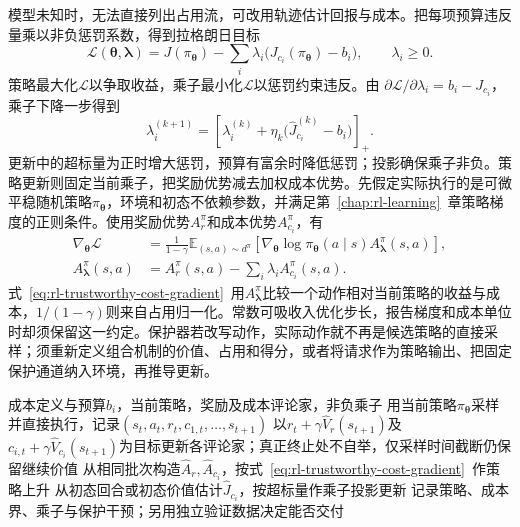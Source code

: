 模型未知时，无法直接列出占用流，可改用轨迹估计回报与成本。把每项预算违反量乘以非负惩罚系数，得到拉格朗日目标
\begin{equation}
  \mathcal L(\bm{\theta},\bm{\lambda})
    =J(\pi_{\bm{\theta}})
       -\sum_i\lambda_i\bigl(J_{c_i}(\pi_{\bm{\theta}})-b_i\bigr),
  \qquad \lambda_i\geq0.
  \label{eq:rl-trustworthy-lagrangian}
\end{equation}
策略最大化$\mathcal L$以争取收益，乘子最小化$\mathcal L$以惩罚约束违反。由
$\partial\mathcal L/\partial\lambda_i=b_i-J_{c_i}$，乘子下降一步得到
\[
  \lambda_i^{(k+1)}
   =\left[\lambda_i^{(k)}
       +\eta_k\bigl(\widehat J_{c_i}^{(k)}-b_i\bigr)\right]_+.
\]
更新中的超标量为正时增大惩罚，预算有富余时降低惩罚；投影确保乘子非负。策略更新则固定当前乘子，把奖励优势减去加权成本优势。先假定实际执行的是可微平稳随机策略$\pi_{\bm{\theta}}$，环境和初态不依赖参数，并满足第~\ref{chap:rl-learning}~章策略梯度的正则条件。使用奖励优势$A_r^\pi$和成本优势$A_{c_i}^\pi$，有
\begin{equation}
  \begin{aligned}
    \nabla_{\bm{\theta}}\mathcal L
      &=\frac{1}{1-\gamma}
        \mathbb E_{(s,a)\sim d^\pi}
          \left[\nabla_{\bm{\theta}}\log\pi_{\bm{\theta}}(a\mid s)
                 A_{\bm{\lambda}}^\pi(s,a)\right],\\
    A_{\bm{\lambda}}^\pi(s,a)
      &=A_r^\pi(s,a)-\sum_i\lambda_iA_{c_i}^\pi(s,a).
  \end{aligned}
  \label{eq:rl-trustworthy-cost-gradient}
\end{equation}
式~\eqref{eq:rl-trustworthy-cost-gradient}~用$A_{\bm{\lambda}}^\pi$比较一个动作相对当前策略的收益与成本，$1/(1-\gamma)$则来自占用归一化。常数可吸收入优化步长，报告梯度和成本单位时却须保留这一约定。保护器若改写动作，实际动作就不再是候选策略的直接采样；须重新定义组合机制的价值、占用和得分，或者将请求作为策略输出、把固定保护通道纳入环境，再推导更新。

\begin{algorithm}
  \label{alg:rl-trustworthy-primal-dual}
  \begin{algorithmic}[1]
    \Require 成本定义与预算$b_i$，当前策略，奖励及成本评论家，非负乘子
      \State 用当前策略$\pi_{\bm{\theta}}$采样并直接执行，记录$(s_t,a_t,r_t,c_{1,t},\ldots,s_{t+1})$
      \State 以$r_t+\gamma\widehat V_r(s_{t+1})$及$c_{i,t}+\gamma\widehat V_{c_i}(s_{t+1})$为目标更新各评论家；真正终止处不自举，仅采样时间截断仍保留继续价值
      \State 从相同批次构造$\widehat A_r,\widehat A_{c_i}$，按式~\eqref{eq:rl-trustworthy-cost-gradient}~作策略上升
      \State 从初态回合或初态价值估计$\widehat J_{c_i}$，按超标量作乘子投影更新
      \State 记录策略、成本界、乘子与保护干预；另用独立验证数据决定能否交付
    \EndFor
  \end{algorithmic}
\end{algorithm}

